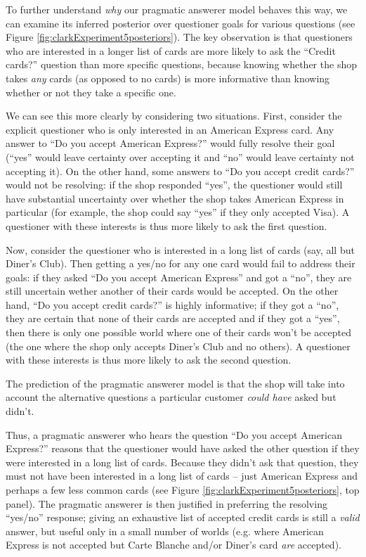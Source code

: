 \documentclass[12pt, floatsintext, jou]{apa6}
\begin{document}
To further understand \emph{why} our pragmatic answerer model behaves this way, we can examine its inferred posterior over questioner goals for various questions (see Figure \ref{fig:clarkExperiment5posteriors}). The key observation is that questioners who are interested in a longer list of cards are more likely to ask the ``Credit cards?'' question than more specific questions, because knowing whether the shop takes \emph{any} cards (as opposed to no cards) is more informative than knowing whether or not they take a specific one. 

We can see this more clearly by considering two situations. First, consider the explicit questioner who is only interested in an American Express card. Any answer to ``Do you accept American Express?'' would fully resolve their goal (``yes'' would leave certainty over accepting it and ``no'' would leave certainty not accepting it). On the other hand, some answers to ``Do you accept credit cards?'' would not be resolving: if the shop responded ``yes'', the questioner would still have substantial uncertainty over whether the shop takes American Express in particular (for example, the shop could say ``yes'' if they only accepted Visa). A questioner with these interests is thus more likely to ask the first question. 

Now, consider the questioner who is interested in a long list of cards (say, all but Diner's Club). Then getting a yes/no for any one card would fail to address their goals: if they asked ``Do you accept American Express'' and got a ``no'', they are still uncertain wether another of their cards would be accepted. On the other hand, ``Do you accept credit cards?'' is highly informative; if they got a ``no'', they are certain that none of their cards are accepted and if they got a ``yes'', then there is only one possible world where one of their cards won't be accepted (the one where the shop only accepts Diner's Club and no others). A questioner with these interests is thus more likely to ask the second question.

The prediction of the pragmatic answerer model is that the shop will take into account the alternative questions a particular customer \emph{could have} asked but didn't. 

Thus, a pragmatic answerer who hears the question ``Do you accept American Express?'' reasons that the questioner would have asked the other question if they were interested in a long list of cards. Because they didn't ask that question, they must not have been interested in a long list of cards -- just American Express and perhaps a few less common cards (see Figure \ref{fig:clarkExperiment5posteriors}, top panel). The pragmatic answerer is then justified in preferring the resolving ``yes/no'' response; giving an exhaustive list of accepted credit cards is still a \emph{valid} answer, but useful only in a small number of worlds (e.g. where American Express is not accepted but Carte Blanche and/or Diner's card \emph{are} accepted).
\end{document}
